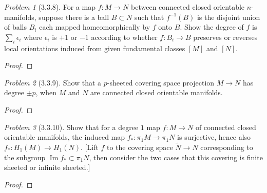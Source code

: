\documentclass[10pt]{article}
\newcommand{\sk}{\vskip 10mm}
\newcommand{\wt}[1]{\widetilde{#1}}
\DeclareMathOperator{\img}{Im}
\theoremstyle{remark}
\newtheorem{problem}{Problem}
\begin{document}
\begin{problem}[3.3.8]
  For a map $f:M\rightarrow N$ between connected closed orientable
  $n$-manifolds, suppose there is a ball $B\subset N$ such that $f^{-1}(B)$ is
  the disjoint union of balls $B_i$ each mapped homeomorphically by $f$ onto
  $B$. Show the degree of $f$ is $\sum_i\epsilon_i$ where $\epsilon_i$ is
  $+1$ or $-1$ according to whether $f:B_i\rightarrow B$ preserves or reverses
  local orientations induced from given fundamental classes $[M]$ and $[N]$.
\end{problem}

\begin{proof}
  
\end{proof}

\sk

\begin{problem}[3.3.9]
  Show that a $p$-sheeted covering space projection $M\rightarrow N$ has
  degree $\pm p$, when $M$ and $N$ are connected closed orientable manifolds.
\end{problem}

\begin{proof}
  
\end{proof}

\sk

\begin{problem}[3.3.10]
  Show that for a degree $1$ map $f:M\rightarrow N$ of connected closed
  orientable manifolds, the induced map $f_*:\pi_1 M\rightarrow \pi_1 N$ is
  surjective, hence also $f_*:H_1(M)\rightarrow H_1(N)$. [Lift $f$ to the
  covering space $\wt{N}\rightarrow N$ corresponding to the subgroup
  $\img f_*\subset\pi_1 N$, then consider the two cases that this covering is
  finite sheeted or infinite sheeted.]
\end{problem}

\begin{proof}
  
\end{proof}
\end{document}
